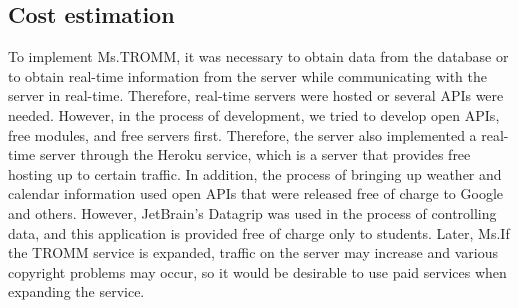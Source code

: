 \documentclass[conference]{IEEEtran}
\begin{document}
\subsection{Cost estimation}
To implement Ms.TROMM, it was necessary to obtain data from the database or to obtain real-time information from the server while communicating with the server in real-time. Therefore, real-time servers were hosted or several APIs were needed. However, in the process of development, we tried to develop open APIs, free modules, and free servers first. Therefore, the server also implemented a real-time server through the Heroku service, which is a server that provides free hosting up to certain traffic. In addition, the process of bringing up weather and calendar information used open APIs that were released free of charge to Google and others. However, JetBrain's Datagrip was used in the process of controlling data, and this application is provided free of charge only to students. Later, Ms.If the TROMM service is expanded, traffic on the server may increase and various copyright problems may occur, so it would be desirable to use paid services when expanding the service. \\ \\ \\ \\ \\
\end{document}
